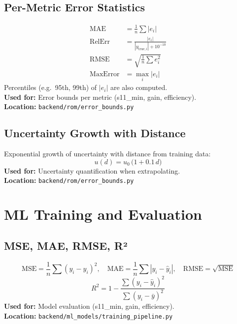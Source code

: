 \documentclass[11pt,a4paper]{article}
\begin{document}
\subsection{Per-Metric Error Statistics}
\begin{align}
\mathrm{MAE} &= \frac{1}{n}\sum |e_i| \\
\mathrm{RelErr} &= \frac{|e_i|}{|y_{\mathrm{true},i}| + 10^{-10}} \\
\mathrm{RMSE} &= \sqrt{\frac{1}{n}\sum e_i^2} \\
\mathrm{MaxError} &= \max_i |e_i|
\end{align}
Percentiles (e.g.\ 95th, 99th) of \(|e_i|\) are also computed. \\
\textbf{Used for:} Error bounds per metric (s11\_min, gain, efficiency). \\
\textbf{Location:} \texttt{backend/rom/error\_bounds.py}

\subsection{Uncertainty Growth with Distance}
Exponential growth of uncertainty with distance from training data:
\begin{equation}
u(d) = u_0\, \bigl(1 + 0.1\, d\bigr)
\end{equation}
\textbf{Used for:} Uncertainty quantification when extrapolating. \\
\textbf{Location:} \texttt{backend/rom/error\_bounds.py}

\section{ML Training and Evaluation}

\subsection{MSE, MAE, RMSE, R²}
\begin{equation}
\mathrm{MSE} = \frac{1}{n}\sum (y_i - \hat{y}_i)^2,\quad
\mathrm{MAE} = \frac{1}{n}\sum |y_i - \hat{y}_i|,\quad
\mathrm{RMSE} = \sqrt{\mathrm{MSE}}
\end{equation}
\begin{equation}
R^2 = 1 - \frac{\sum (y_i - \hat{y}_i)^2}{\sum (y_i - \bar{y})^2}
\end{equation}
\textbf{Used for:} Model evaluation (s11\_min, gain, efficiency). \\
\textbf{Location:} \texttt{backend/ml\_models/training\_pipeline.py}
\end{document}
